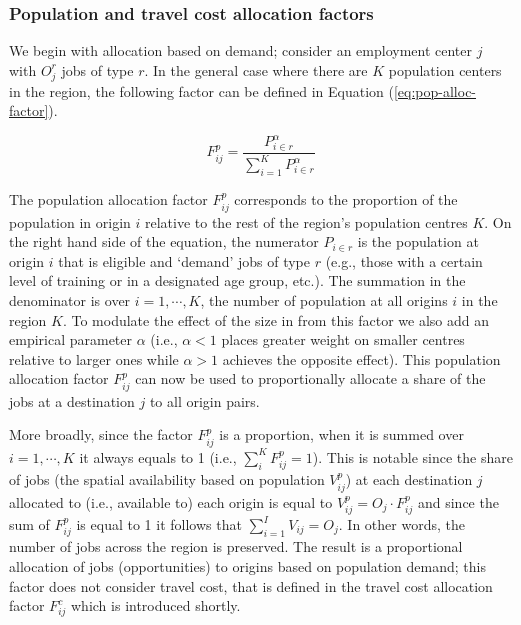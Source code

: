 \documentclass[]{elsarticle} %
\begin{document}
\hypertarget{population-and-travel-cost-allocation-factors}{%
\subsubsection{Population and travel cost allocation
factors}\label{population-and-travel-cost-allocation-factors}}

We begin with allocation based on demand; consider an employment center
\(j\) with \(O_j^r\) jobs of type \(r\). In the general case where there
are \(K\) population centers in the region, the following factor can be
defined in Equation (\ref{eq:pop-alloc-factor}).

\begin{equation}
\label{eq:pop-alloc-factor}
F^p_{ij} = \frac{P_{i\in r}^\alpha}{\sum_{i=1}^K P_{i\in r}^\alpha}
\end{equation}

The population allocation factor \(F^p_{ij}\) corresponds to the
proportion of the population in origin \(i\) relative to the rest of the
region's population centres \(K\). On the right hand side of the
equation, the numerator \(P_{i\in r}\) is the population at origin \(i\)
that is eligible and `demand' jobs of type \(r\) (e.g., those with a
certain level of training or in a designated age group, etc.). The
summation in the denominator is over \(i=1,\cdots,K\), the number of
population at all origins \(i\) in the region \(K\). To modulate the
effect of the size in from this factor we also add an empirical
parameter \(\alpha\) (i.e., \(\alpha <1\) places greater weight on
smaller centres relative to larger ones while \(\alpha>1\) achieves the
opposite effect). This population allocation factor \(F^p_{ij}\) can now
be used to proportionally allocate a share of the jobs at a destination
\(j\) to all origin pairs.

More broadly, since the factor \(F^p_{ij}\) is a proportion, when it is
summed over \(i=1,\cdots,K\) it always equals to 1 (i.e.,
\(\sum_i^{K} F^p_{ij} = 1\)). This is notable since the share of jobs
(the spatial availability based on population \(V^p_{ij}\)) at each
destination \(j\) allocated to (i.e., available to) each origin is equal
to \(V^p_{ij} = O_j \cdot F^p_{ij}\) and since the sum of \(F^p_{ij}\)
is equal to 1 it follows that \(\sum_{i=1}^I V_{ij} = O_j\). In other
words, the number of jobs across the region is preserved. The result is
a proportional allocation of jobs (opportunities) to origins based on
population demand; this factor does not consider travel cost, that is
defined in the travel cost allocation factor \(F^c_{ij}\) which is
introduced shortly.
\end{document}
